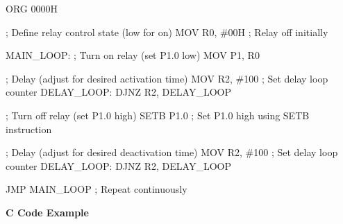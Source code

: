 \documentclass[
]{article}
\newenvironment{Shaded}{}{}
\newcommand{\NormalTok}[1]{#1}
\begin{document}
\begin{Shaded}
\begin{Highlighting}[]
\NormalTok{ORG 0000H}

\NormalTok{; Define relay control state (low for on)}
\NormalTok{MOV R0, \#00H  ; Relay off initially}

\NormalTok{MAIN\_LOOP:}
\NormalTok{    ; Turn on relay (set P1.0 low)}
\NormalTok{    MOV P1, R0}

\NormalTok{    ; Delay (adjust for desired activation time)}
\NormalTok{    MOV R2, \#100  ; Set delay loop counter}
\NormalTok{    DELAY\_LOOP:}
\NormalTok{        DJNZ R2, DELAY\_LOOP}

\NormalTok{    ; Turn off relay (set P1.0 high)}
\NormalTok{    SETB P1.0   ; Set P1.0 high using SETB instruction}

\NormalTok{    ; Delay (adjust for desired deactivation time)}
\NormalTok{    MOV R2, \#100  ; Set delay loop counter}
\NormalTok{    DELAY\_LOOP:}
\NormalTok{        DJNZ R2, DELAY\_LOOP}

\NormalTok{    JMP MAIN\_LOOP  ; Repeat continuously}
\end{Highlighting}
\end{Shaded}

\textbf{C Code Example}
\end{document}

